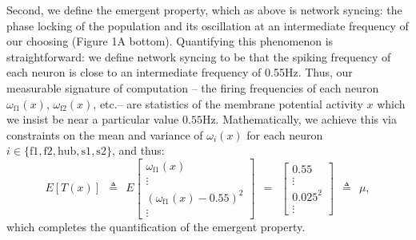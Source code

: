 \documentclass[11pt]{article}
\begin{document}
Second, we define the emergent property, which as above is network syncing: the phase locking of the population and its oscillation at an intermediate frequency of our choosing (Figure 1A bottom).
Quantifying this phenomenon is straightforward: we define network syncing to be that the spiking frequency of each neuron is close to an intermediate frequency of 0.55Hz.  
Thus, our measurable signature of computation -- the firing frequencies of each neuron $\omega_{\text{f1}}(x)$, $\omega_{\text{f2}}(x)$, etc.-- are statistics of the membrane potential activity $x$ which we insist be near a particular value $0.55$Hz.  Mathematically, we achieve this via constraints on the mean and variance of $\omega_i(x)$ for each neuron $i \in \{ \text{f1}, \text{f2}, \text{hub}, \text{s1}, \text{s2} \}$, and thus:
\begin{equation}\label{eq:EP}
 E\left[T(x) \right] ~~\triangleq~~ E\begin{bmatrix} \omega_{\text{f1}}(x) \\ \vdots \\ (\omega_{\text{f1}}(x) - 0.55)^2 \\ \vdots \end{bmatrix} ~~=~~  
 \begin{bmatrix} 0.55 \\ \vdots \\ 0.025^2 \\ \vdots \end{bmatrix} ~~\triangleq~~ \mu,
 \end{equation}
  which completes the quantification of the emergent property.
\end{document}
